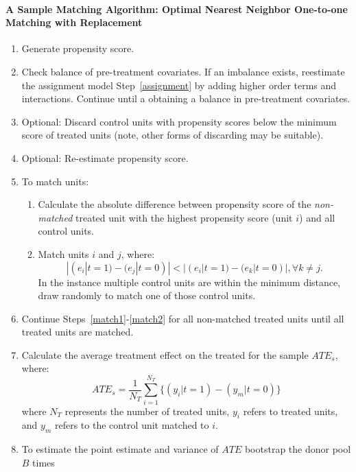 \documentclass[11pt,titlepage]{article}
\begin{document}
\paragraph{A Sample Matching Algorithm: Optimal Nearest Neighbor One-to-one
Matching with Replacement}
\begin{enumerate}
\item Generate propensity score. \label{assignment}
\item Check balance of pre-treatment covariates.  If an imbalance
  exists, reestimate the assignment model Step~\ref{assignment} by adding
  higher order terms and interactions.  Continue until a obtaining a
  balance in pre-treatment covariates.  
\item Optional: Discard control units with propensity scores below the minimum
  score of treated units (note, other forms of discarding may be suitable).
\item Optional: Re-estimate propensity score.
\item To match units: \label{match}
  \begin{enumerate}
  \item Calculate the absolute difference between propensity
    score of the \emph{non-matched} treated unit with the highest propensity
    score (unit $i$) and all control units. \label{match1}
  \item Match units $i$ and $j$, where:
    \begin{equation}
      | (e_i | t=1)-(e_j | t=0) | < | (e_i | t=1)-(e_k | t=0) |,  \forall k \ne j.  
    \end{equation}
    In the instance multiple control units are
    within the minimum distance, draw randomly to match one of those
    control units. \label{match2}
  \end{enumerate}
\item Continue Steps~\ref{match1}-\ref{match2} for all non-matched
  treated units until all treated units
  are matched. \label{match3}
\item Calculate the average treatment effect on the treated for the
  sample $ATE_s$, where:
  \begin{equation}
    ATE_s=\frac{1}{N_T} \sum_{i=1}^{N_T} \big\{ (y_i|t=1) - (y_m|t=0)
    \big \}
  \end{equation}
where $N_T$ represents the number of treated units, $y_i$ refers to
treated units, and $y_m$ refers to the control unit matched to $i$. 
\item To estimate the point estimate and variance of $ATE$ bootstrap the donor pool $B$ times

\end{enumerate}
\end{document}
